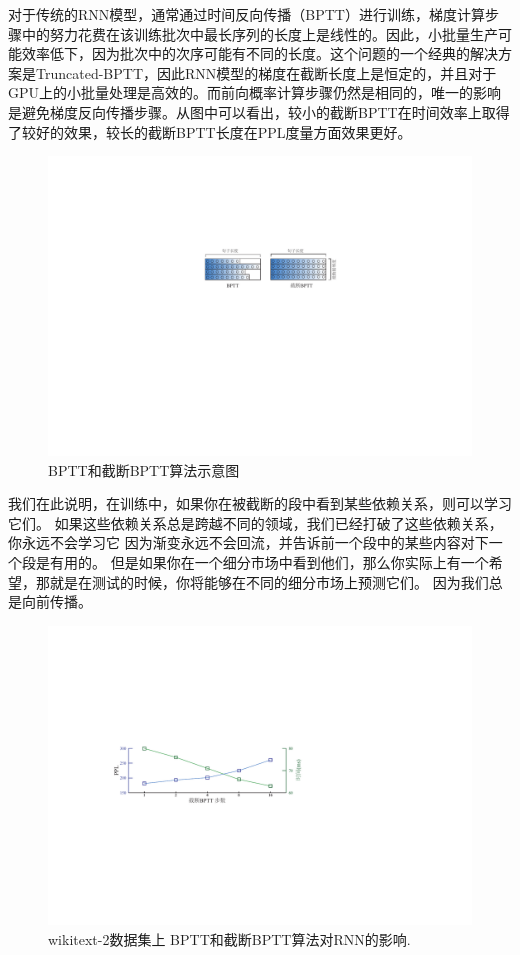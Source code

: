 对于传统的RNN模型，通常通过时间反向传播（BPTT）进行训练，梯度计算步骤中的努力花费在该训练批次中最长序列的长度上是线性的。因此，小批量生产可能效率低下，因为批次中的次序可能有不同的长度。这个问题的一个经典的解决方案是Truncated-BPTT，因此RNN模型的梯度在截断长度上是恒定的，并且对于GPU上的小批量处理是高效的。而前向概率计算步骤仍然是相同的，唯一的影响是避免梯度反向传播步骤。从图中可以看出，较小的截断BPTT在时间效率上取得了较好的效果，较长的截断BPTT长度在PPL度量方面效果更好。
\begin{figure}[!h]
  \centering
  \includegraphics[width=0.7\columnwidth]{./figures/minibatch.pdf}
  \caption{BPTT和截断BPTT算法示意图}\label{fig:minibatch}
\end{figure}

我们在此说明，在训练中，如果你在被截断的段中看到某些依赖关系，则可以学习它们。 如果这些依赖关系总是跨越不同的领域，我们已经打破了这些依赖关系，你永远不会学习它 因为渐变永远不会回流，并告诉前一个段中的某些内容对下一个段是有用的。 但是如果你在一个细分市场中看到他们，那么你实际上有一个希望，那就是在测试的时候，你将能够在不同的细分市场上预测它们。 因为我们总是向前传播。
\begin{figure}[!h]
  \centering
  \includegraphics[width=0.9\columnwidth]{./figures/tbptt.pdf}
  \caption{wikitext-2数据集上 BPTT和截断BPTT算法对RNN的影响.}\label{fig:tbptt}
\end{figure}
